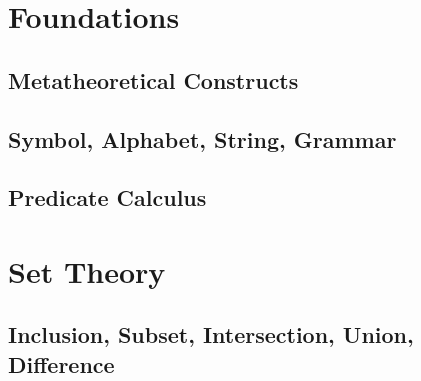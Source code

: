 \section{Foundations}
\subsection{Metatheoretical Constructs}


\subsection{Symbol, Alphabet, String, Grammar}





 
\subsection{Predicate Calculus}








 


\section{Set Theory}
\subsection{Inclusion, Subset, Intersection, Union, Difference}









